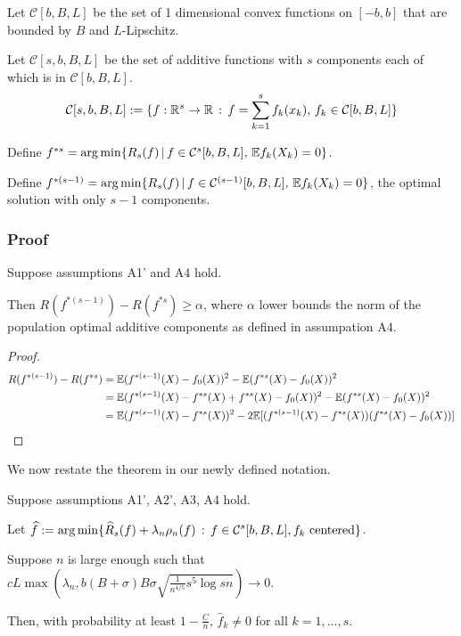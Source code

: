 Let $\mathcal{C}[b,B,L]$ be the set of 1 dimensional convex functions on $[-b,b]$ that are bounded by $B$ and $L$-Lipschitz.

Let $\mathcal{C}[s,b,B,L]$ be the set of additive functions with $s$ components each of which is in $\mathcal{C}[b,B,L]$. 
\[
\mathcal{C}[s,b,B,L] := \{ f : {\mathbb R}^s \rightarrow {\mathbb R} \,:\, f = \sum_{k=1}^s f_k(x_k), \, f_k \in \mathcal{C}[b,B,L] \}
\]
 
Define $f^{*s} = \arg\min \{ R_s(f) \,|\, f \in \mathcal{C}^s[b,B,L], \, {\mathbb E} f_k(X_k) = 0\}$.

Define $f^{*(s-1)} = \arg\min \{ R_s(f) \,|\, f \in \mathcal{C}^{(s-1)}[b,B,L], \, {\mathbb E} f_k(X_k) = 0\}$, the optimal solution with only $s-1$ components.


\subsubsection{Proof}

\begin{lemma}
Suppose assumptions A1' and A4 hold. 

Then $R(f^{*(s-1)}) - R(f^{*s}) \geq \alpha$, where $\alpha$ lower bounds the norm of the population optimal additive components as defined in assumpation A4.
\end{lemma}

\begin{proof}

\begin{align*}
R(f^{*(s-1)}) - R(f^{*s}) &= {\mathbb E}(f^{*(s-1)}(X) - f_0(X))^2 - {\mathbb E}(f^{*s}(X) - f_0(X))^2 \\
    &= {\mathbb E}( f^{*(s-1)}(X) - f^{*s}(X) + f^{*s}(X) - f_0(X))^2 - {\mathbb E}(f^{*s}(X) - f_0(X))^2 \\
    &= {\mathbb E}( f^{*(s-1)}(X) - f^{*s}(X))^2 - 2 {\mathbb E}[ (f^{*(s-1)}(X) - f^{*s}(X)) (f^{*s}(X) - f_0(X) ) ]
\end{align*}



\end{proof}


We now restate the theorem in our newly defined notation.
 
\begin{theorem} 
Suppose assumptions A1', A2', A3, A4 hold. 

Let $\displaystyle \widehat{f} := \arg\min \{ \widehat{R}_s(f) + \lambda_n \rho_n(f) \,:\, f \in \mathcal{C}^s[b,B,L], f_k \textrm{ centered} \}$.

Suppose $n$ is large enough such that $c L \max \left(\lambda_n, b (B+\sigma)B\sigma \sqrt{\frac{1}{n^{4/5}} s^5 \log sn} \right) \rightarrow 0$.

Then, with probability at least $1-\frac{C}{n}$, $\hat{f}_k \neq 0$ for all $k =1,...,s$.
\end{theorem}

